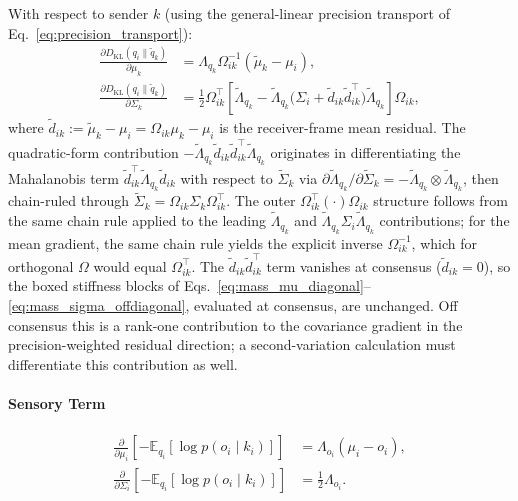 With respect to sender $k$ (using the general-linear precision transport of Eq.~\eqref{eq:precision_transport}):
\begin{align}
\frac{\partial D_{\mathrm{KL}}(q_i \| \tilde{q}_k)}{\partial \mu_k} &= \Lambda_{q_k}\Omega_{ik}^{-1}(\tilde{\mu}_k - \mu_i), \\
\frac{\partial D_{\mathrm{KL}}(q_i \| \tilde{q}_k)}{\partial \Sigma_k} &= \frac{1}{2}\Omega_{ik}^\top\left[\tilde{\Lambda}_{q_k} - \tilde{\Lambda}_{q_k}\big(\Sigma_i + \tilde{d}_{ik}\tilde{d}_{ik}^\top\big)\tilde{\Lambda}_{q_k}\right]\Omega_{ik},
\end{align}
where $\tilde{d}_{ik} := \tilde{\mu}_k - \mu_i = \Omega_{ik}\mu_k - \mu_i$ is the receiver-frame mean residual. The quadratic-form contribution $-\tilde{\Lambda}_{q_k}\tilde{d}_{ik}\tilde{d}_{ik}^\top\tilde{\Lambda}_{q_k}$ originates in differentiating the Mahalanobis term $\tilde{d}_{ik}^\top \tilde{\Lambda}_{q_k}\tilde{d}_{ik}$ with respect to $\tilde{\Sigma}_k$ via $\partial \tilde{\Lambda}_{q_k}/\partial \tilde{\Sigma}_k = -\tilde{\Lambda}_{q_k}\otimes\tilde{\Lambda}_{q_k}$, then chain-ruled through $\tilde{\Sigma}_k = \Omega_{ik}\Sigma_k\Omega_{ik}^\top$. The outer $\Omega_{ik}^\top(\cdot)\Omega_{ik}$ structure follows from the same chain rule applied to the leading $\tilde{\Lambda}_{q_k}$ and $\tilde{\Lambda}_{q_k}\Sigma_i\tilde{\Lambda}_{q_k}$ contributions; for the mean gradient, the same chain rule yields the explicit inverse $\Omega_{ik}^{-1}$, which for orthogonal $\Omega$ would equal $\Omega_{ik}^\top$. The $\tilde{d}_{ik}\tilde{d}_{ik}^\top$ term vanishes at consensus ($\tilde{d}_{ik} = 0$), so the boxed stiffness blocks of Eqs.~\eqref{eq:mass_mu_diagonal}--\eqref{eq:mass_sigma_offdiagonal}, evaluated at consensus, are unchanged. Off consensus this is a rank-one contribution to the covariance gradient in the precision-weighted residual direction; a second-variation calculation must differentiate this contribution as well.

\paragraph{Sensory Term}
\begin{align}
\frac{\partial}{\partial \mu_i}\left[-\mathbb{E}_{q_i}[\log p(o_i \mid k_i)]\right] &= \Lambda_{o_i}(\mu_i - o_i), \\
\frac{\partial}{\partial \Sigma_i}\left[-\mathbb{E}_{q_i}[\log p(o_i \mid k_i)]\right] &= \frac{1}{2}\Lambda_{o_i}.
\end{align}

